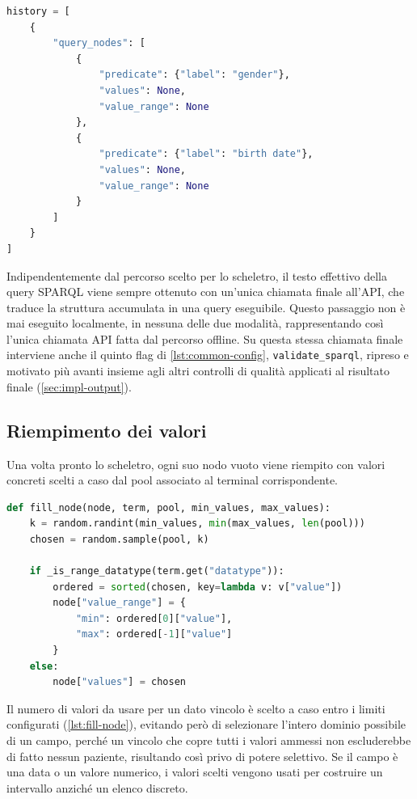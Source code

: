 \documentclass[12pt,a4paper,openright,twoside]{book}
\begin{document}
\begin{lstlisting}[language=Python, caption={Lo scheletro appena ricostruito per i terminal \texttt{gender} e \texttt{birth date}, ancora privo di valori.}, label={lst:skeleton-example}]
history = [
    {
        "query_nodes": [
            {
                "predicate": {"label": "gender"},
                "values": None,
                "value_range": None
            },
            {
                "predicate": {"label": "birth date"},
                "values": None,
                "value_range": None
            }
        ]
    }
]
\end{lstlisting}

Indipendentemente dal percorso scelto per lo scheletro, il testo effettivo della
query SPARQL viene sempre ottenuto con un'unica chiamata finale all'API, che
traduce la struttura accumulata in una query eseguibile. Questo passaggio non è
mai eseguito localmente, in nessuna delle due modalità, rappresentando così
l'unica chiamata API fatta dal percorso offline. Su questa stessa chiamata
finale interviene anche il quinto flag di \cref{lst:common-config},
\texttt{validate\_sparql}, ripreso e motivato più avanti insieme agli altri
controlli di qualità applicati al risultato finale (\cref{sec:impl-output}).

\subsection{Riempimento dei valori}
\label{sec:impl-values}

Una volta pronto lo scheletro, ogni suo nodo vuoto viene riempito con valori
concreti scelti a caso dal pool associato al terminal corrispondente.

\begin{lstlisting}[language=Python, caption={Riempimento di un nodo dello scheletro con valori concreti, distinguendo tra intervalli e insiemi discreti.}, label={lst:fill-node}]
def fill_node(node, term, pool, min_values, max_values):
    k = random.randint(min_values, min(max_values, len(pool)))
    chosen = random.sample(pool, k)
    
    if _is_range_datatype(term.get("datatype")):
        ordered = sorted(chosen, key=lambda v: v["value"])
        node["value_range"] = {
            "min": ordered[0]["value"],
            "max": ordered[-1]["value"]
        }
    else:
        node["values"] = chosen
\end{lstlisting}

Il numero di valori da usare per un dato vincolo è scelto a caso entro i limiti
configurati (\cref{lst:fill-node}), evitando però di selezionare l'intero
dominio possibile di un campo, perché un vincolo che copre tutti i valori
ammessi non escluderebbe di fatto nessun paziente, risultando così privo di
potere selettivo. Se il campo è una data o un valore numerico, i valori scelti
vengono usati per costruire un intervallo anziché un elenco discreto.
\end{document}
